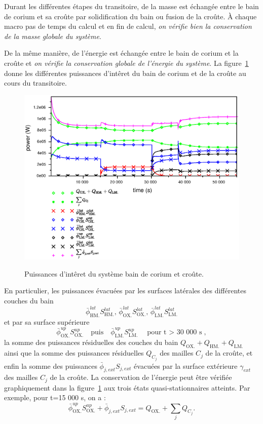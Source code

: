 Durant les différentes étapes du transitoire, de la masse est échangée entre le bain de corium et sa croûte par solidification du bain ou fusion de la croûte. À chaque macro pas de temps du calcul et en fin de calcul, \emph{on vérifie bien la conservation de la masse globale du système}.

De la même manière, de l'énergie est échangée entre le bain de corium et la croûte et \emph{on vérifie la conservation globale de l'énergie du système}. La figure~\ref{fig:thermal_balance} donne les différentes puissances d'intêret du bain de corium et de la croûte au cours du transitoire.
\begin{figure}
\centering
\includegraphics[width=\textwidth, keepaspectratio=true]{Figures/thermal_balance.eps}\\
\caption{Puissances d'intêret du système bain de corium et croûte.}
\label{fig:thermal_balance}
\end{figure}
En particulier, les puissances évacuées par les surfaces latérales des différentes couches du bain 
\begin{equation*}
\bar{\phi}^{lat}_\textrm{HM.}S^{lat}_\textrm{HM.},\,\bar{\phi}^{lat}_\textrm{OX.}S^{lat}_\textrm{OX.},\,\bar{\phi}^{lat}_\textrm{LM.}S^{lat}_\textrm{LM.}
\end{equation*}
et par sa surface supérieure 
\begin{equation*}
\bar{\phi}^{up}_\textrm{OX.}S^{up}_\textrm{OX.}\quad\text{puis}\quad\bar{\phi}^{up}_\textrm{LM.}S^{up}_\textrm{LM.}\quad\text{pour t $>$ 30 000 s},
\end{equation*}
la somme des puissances résiduelles des couches du bain $Q_\textrm{OX.}+Q_\textrm{HM.}+Q_\textrm{LM.}$ ainsi que la somme des puissances résiduelles $Q_{C_j}$ des mailles $C_j$ de la croûte, et enfin la somme des puissances $\bar{\phi}_{j,ext}S_{j,ext}$ évacuées par la surface extérieure $\gamma_{ext}$ des mailles $C_j$ de la croûte. La conservation de l'énergie peut être vérifiée graphiquement dans la figure~\ref{fig:thermal_balance} aux trois états quasi-stationnaires atteints. Par exemple, pour t=15 000 s, on a :
\begin{equation}
\bar{\phi}^{up}_\textrm{OX.}S^{up}_\textrm{OX.} + \bar{\phi}_{j,ext}S_{j,ext} = Q_\textrm{OX.} + \sum_j Q_{C_j}.
\end{equation}

